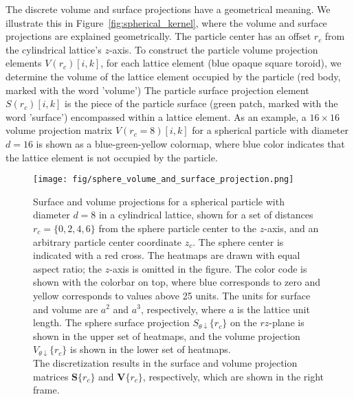 \documentclass[10pt, a4paper]{article}
\begin{document}
\begin{multicols}{2}
The discrete volume and surface projections have a geometrical meaning.
We illustrate this in Figure~\ref{fig:spherical_kernel}, where the volume and surface projections are explained geometrically.
The particle center has an offset $r_c$ from the cylindrical lattice's $z$-axis.
To construct the particle volume projection elements $V(r_c)[i, k]$, for each lattice element (blue opaque square toroid), we determine the volume of the lattice element occupied by the particle (red body, marked with the word 'volume')
The particle surface projection element $S(r_c)[i, k]$ is the piece of the particle surface (green patch, marked with the word 'surface') encompassed within a lattice element.
As an example, a $16 \times 16$ volume projection matrix $V(r_c = 8)[i, k]$ for a spherical particle with diameter $d = 16$ is shown as a blue-green-yellow colormap, where blue color indicates that the lattice element is not occupied by the particle.


\end{multicols}

\begin{figure}[H]
    \centering
    \texttt{[image: fig/sphere\_volume\_and\_surface\_projection.png]}
    \caption{
        Surface and volume projections for a spherical particle with diameter $d = 8$ in a cylindrical lattice, shown for a set of distances $r_c = \{0, 2, 4, 6\}$ from the sphere particle center to the $z$-axis, and an arbitrary particle center coordinate $z_c$.
        The sphere center is indicated with a red cross.
        The heatmaps are drawn with equal aspect ratio; the $z$-axis is omitted in the figure.
        The color code is shown with the colorbar on top, where blue corresponds to zero and yellow corresponds to values above 25 units.
        The units for surface and volume are $a^2$ and $a^3$, respectively, where $a$ is the lattice unit length.
        The sphere surface projection $S_{\theta \downarrow}\{r_c\}$ on the $rz$-plane is shown in the upper set of heatmaps, and the volume projection $V_{\theta \downarrow}\{r_c\}$ is shown in the lower set of heatmaps.
        \\
        The discretization results in the surface and volume projection matrices $\bm{S}\{r_c\}$ and $\bm{V}\{r_c\}$, respectively, which are shown in the right frame.
    }
    \label{fig:sphere_volume_and_surface_projection}
\end{figure}

\pagebreak
\end{document}
